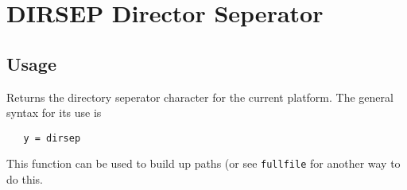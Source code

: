 \section{DIRSEP Director Seperator}

\subsection{Usage}

Returns the directory seperator character for the current platform.  The 
general syntax for its use is
\begin{verbatim}
   y = dirsep
\end{verbatim}
This function can be used to build up paths (or see \verb|fullfile| for another
way to do this.
